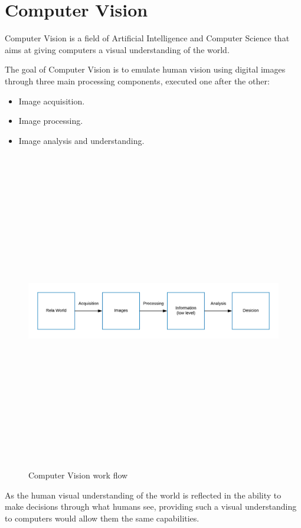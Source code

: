 \section{Computer Vision}
Computer Vision is a field of Artificial Intelligence and Computer Science that aims at giving computers a visual understanding of the world.

The goal of Computer Vision is to emulate human vision using digital images through three main processing components, executed one after the other:
\begin{itemize}
    \item Image acquisition.
    \item Image processing.
    \item Image analysis and understanding.
\end{itemize}
\begin{figure}[H]
\centering
\includegraphics[width=14cm,height=14cm,keepaspectratio]{imagenes/ComputerVisionBlocks.png}
\caption{Computer Vision work flow}
\label{fig:ComputerVision}
\end{figure}
As the human visual understanding of the world is reflected in the ability to make decisions through what humans see, providing such a visual understanding to computers would allow them the same capabilities.

